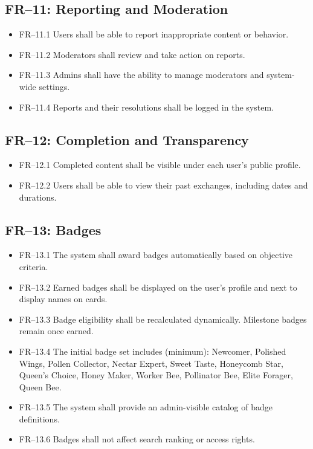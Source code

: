 \documentclass[10pt,a4paper]{report}
\begin{document}
\subsection{FR--11: Reporting and Moderation}
\begin{itemize}
    \item FR--11.1 Users shall be able to report inappropriate content or behavior.
    \item FR--11.2 Moderators shall review and take action on reports.
    \item FR--11.3 Admins shall have the ability to manage moderators and system-wide settings.
    \item FR--11.4 Reports and their resolutions shall be logged in the system.
\end{itemize}

\subsection{FR--12: Completion and Transparency}
\begin{itemize}
    \item FR--12.1 Completed content shall be visible under each user's public profile.
    \item FR--12.2 Users shall be able to view their past exchanges, including dates and durations.
\end{itemize}

\subsection{FR--13: Badges}
\begin{itemize}
    \item FR--13.1 The system shall award badges automatically based on objective criteria.
    \item FR--13.2 Earned badges shall be displayed on the user's profile and next to display names on cards.
    \item FR--13.3 Badge eligibility shall be recalculated dynamically. Milestone badges remain once earned.
    \item FR--13.4 The initial badge set includes (minimum): Newcomer, Polished Wings, Pollen Collector, Nectar Expert, Sweet Taste, Honeycomb Star, Queen's Choice, Honey Maker, Worker Bee, Pollinator Bee, Elite Forager, Queen Bee.
    \item FR--13.5 The system shall provide an admin-visible catalog of badge definitions.
    \item FR--13.6 Badges shall not affect search ranking or access rights.
\end{itemize}
\end{document}
